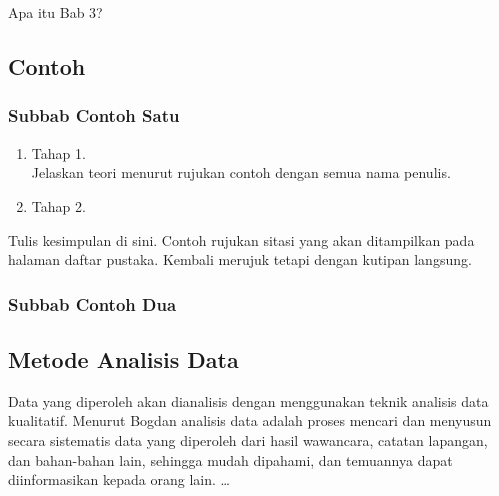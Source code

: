 \chapter{\babTiga}
Apa itu Bab 3?


\section{Contoh}
\subsection{Subbab Contoh Satu}
\lipsum[7]

\begin{enumerate}
	\item Tahap 1. \\ %
	Jelaskan teori menurut rujukan contoh \autocite{sahroni2018fikih} dengan semua nama penulis.

	\lipsum[6-8]

	\item Tahap 2.
\end{enumerate}

Tulis kesimpulan di sini. Contoh rujukan sitasi \autocite{UINJAKARTARoikhan2017} yang akan
ditampilkan pada halaman daftar pustaka.
Kembali merujuk \textcite{sahroni2018fikih} tetapi dengan kutipan langsung.

\subsection{Subbab Contoh Dua}

\lipsum[55-57]

\section{Metode Analisis Data}

Data yang diperoleh akan dianalisis dengan menggunakan teknik analisis data kualitatif.
Menurut Bogdan \autocite{Sugiyono2008} analisis data adalah proses mencari dan menyusun
secara sistematis data yang diperoleh dari hasil wawancara, catatan lapangan, dan
bahan-bahan lain, sehingga  mudah dipahami, dan temuannya dapat diinformasikan kepada orang lain.
\ldots

